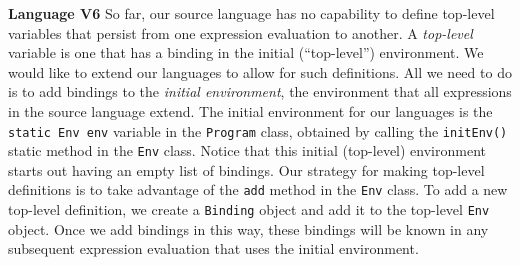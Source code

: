 \begin{minipage}[t]{\sw}
\slidenumber
\LARGE
{\bf Language V6}\exx
So far, our source language has no capability to define top-level
variables that persist from one expression evaluation to another.
A {\em top-level} variable is one that has a binding
in the initial (``top-level'') environment.
We would like to extend our languages to allow for such definitions.
All we need to do is to add bindings
to the {\em initial environment}, the environment that all expressions
in the source language extend.\exx
The initial environment for our languages
is the \verb'static Env env' variable in the \verb'Program' class,
obtained by calling the \verb'initEnv()' static method
in the \verb'Env' class.
Notice that this initial (top-level) environment starts out having
an empty list of bindings.\exx
Our strategy for making top-level definitions is
to take advantage of the \verb'add' method in the \verb'Env' class.
To add a new top-level definition,
we create a \verb'Binding' object and add it
to the top-level \verb'Env' object.
Once we add bindings in this way, these bindings will be known
in any subsequent expression evaluation that uses the initial environment.
\end{minipage}
\clearpage
